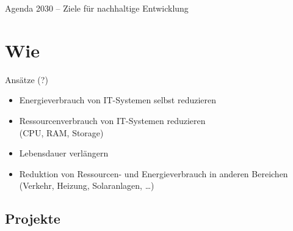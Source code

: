\documentclass[t]{beamer}
\begin{document}
\begin{frame}{Agenda 2030 -- Ziele für nachhaltige Entwicklung}
\end{frame}

\section{Wie}

\begin{frame}{Ansätze (?)}
    \begin{itemize}
        \item Energieverbrauch von IT-Systemen selbst reduzieren
        \item Ressourcenverbrauch von IT-Systemen reduzieren \\
            (CPU, RAM, Storage)
        \item Lebensdauer verlängern
        \item Reduktion von Ressourcen- und Energieverbrauch in anderen Bereichen \\
            (Verkehr, Heizung, Solaranlagen, …)
    \end{itemize}
\end{frame}

\subsection{Projekte}
\end{document}
